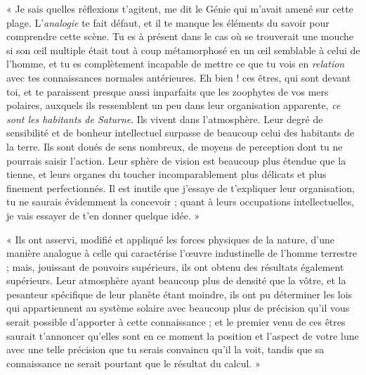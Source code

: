 \documentclass[a4paper, 11pt, oneside]{article}
\begin{document}
« Je sais quelles réflexions t'agitent, me dit le Génie qui m'avait amené sur cette plage. L'\emph{analogie} te fait défaut, et il te manque les éléments du savoir pour comprendre cette scène. Tu es à présent dans le cas où se trouverait une mouche si son œil multiple était tout à coup métamorphosé en un œil semblable à celui de l'homme, et tu es complètement incapable de mettre ce que tu vois en \emph{relation} avec tes connaissances normales antérieures. Eh bien ! ces êtres, qui sont devant toi, et te paraissent presque aussi imparfaits que les zoophytes de vos mers polaires, auxquels ils ressemblent un peu dans leur organisation apparente, \emph{ce sont les habitants de Saturne}. Ils vivent dans l'atmosphère. Leur degré de sensibilité et de bonheur intellectuel surpasse de beaucoup celui des habitants de la terre. Ils sont doués de sens nombreux, de moyens de perception dont tu ne pourrais saisir l'action. Leur sphère de vision est beaucoup plus étendue que la tienne, et leurs organes du toucher incomparablement plus délicats et plus finement perfectionnés. Il est inutile que j'essaye de t'expliquer leur organisation, tu ne saurais évidemment la concevoir ; quant à leurs occupations intellectuelles, je vais essayer de t'en donner quelque idée. »

« Ils ont asservi, modifié et appliqué les forces physiques de la nature, d'une manière analogue à celle qui caractérise l'œuvre industinelle de l'homme terrestre ; mais, jouissant de pouvoirs supérieurs, ils ont obtenu des résultats également supérieurs. Leur atmosphère ayant beaucoup plus de densité que la vôtre, et la pesanteur spécifique de leur planète étant moindre, ils ont pu déterminer les lois qui appartiennent au système solaire avec beaucoup plus de précision qu'il vous serait possible d'apporter à cette connaissance ; et le premier venu de ces êtres saurait t'annoncer qu'elles sont en ce moment la position et l'aspect de votre lune avec une telle précision que tu serais convaincu qu'il la voit, tandis que sa connaissance ne serait pourtant que le résultat du calcul. »
\end{document}
